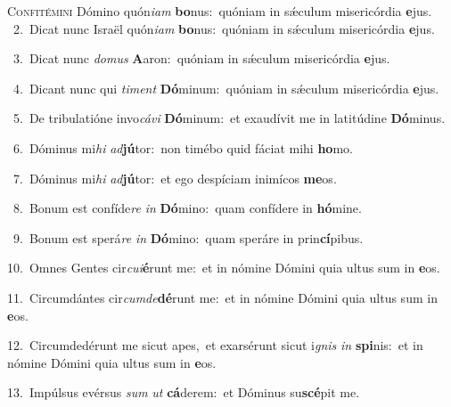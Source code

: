 \lettrine{\initial\textcolor{\initialcolor}{C}}{onfitémini} Dómino quón\-\textit{i}\-\textit{am} \textbf{bo}\-nus:~\star quóniam in sǽculum misericórdia \textbf{e}\-jus.\\
{\numbfont\textcolor{\numbcolor}{~2.}}~Dicat nunc Israël quón\-\textit{i}\-\textit{am} \textbf{bo}\-nus:~\star quóniam in sǽculum misericórdia \textbf{e}\-jus.\par
{\numbfont\textcolor{\numbcolor}{~3.}}~Dicat nunc \textit{do}\-\textit{mus} \textbf{A}\-aron:~\star quóniam in sǽculum misericórdia \textbf{e}\-jus.\par
{\numbfont\textcolor{\numbcolor}{~4.}}~Dicant nunc qui \textit{ti}\-\textit{ment} \textbf{Dó}\-minum:~\star quóniam in sǽculum misericórdia \textbf{e}\-jus.\par
{\numbfont\textcolor{\numbcolor}{~5.}}~De tribulatióne invo\-\textit{cá}\-\textit{vi} \textbf{Dó}\-minum:~\star et exaudívit me in latitúdine \textbf{Dó}\-minus.\par
{\numbfont\textcolor{\numbcolor}{~6.}}~Dóminus mi\textit{hi} \textit{ad}\-\textbf{jú}tor:~\star non timébo quid fáciat mihi \textbf{ho}\-mo.\par
{\numbfont\textcolor{\numbcolor}{~7.}}~Dóminus mi\textit{hi} \textit{ad}\-\textbf{jú}tor:~\star et ego despíciam inimícos \textbf{me}\-os.\par
{\numbfont\textcolor{\numbcolor}{~8.}}~Bonum est confíde\textit{re} \textit{in} \textbf{Dó}\-mino:~\star quam confídere in \textbf{hó}\-mine.\par
{\numbfont\textcolor{\numbcolor}{~9.}}~Bonum est sperá\textit{re} \textit{in} \textbf{Dó}\-mino:~\star quam speráre in prin\-\textbf{cí}\-pibus.\par
{\numbfont\textcolor{\numbcolor}{10.}}~Omnes Gentes cir\-\textit{cu}\-\textit{i}\textbf{é}runt me:~\star et in nómine Dómini quia ultus sum in \textbf{e}\-os.\par
{\numbfont\textcolor{\numbcolor}{11.}}~Circumdántes cir\-\textit{cum}\-\textit{de}\textbf{dé}runt me:~\star et in nómine Dómini quia ultus sum in \textbf{e}\-os.\par
{\numbfont\textcolor{\numbcolor}{12.}}~Circumdedérunt me sicut apes,~\dagger et exarsérunt sicut i\textit{gnis} \textit{in} \textbf{spi}\-nis:~\star et in nómine Dómini quia ultus sum in \textbf{e}\-os.\par
{\numbfont\textcolor{\numbcolor}{13.}}~Impúlsus evérsus \textit{sum} \textit{ut} \textbf{cá}\-derem:~\star et Dóminus su\-\textbf{scé}\-pit me.\par
